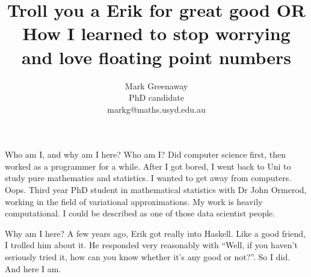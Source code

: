 \documentclass{beamer}
\title{Troll you a Erik for great good OR How I learned to stop worrying and love floating point numbers}
\author{Mark Greenaway \\ PhD candidate \\ markg@maths.usyd.edu.au}
\begin{document}
\begin{frame}
\maketitle
\end{frame}





\begin{frame}{Who am I, and why am I here?}
Who am I?
Did computer science first, then worked as a programmer for a while.
After I got bored, I went back to Uni to study pure mathematics and statistics. I wanted to get away from
computers. Oops.
Third year PhD student in mathematical statistics with Dr John Ormerod, working in the field of variational
approximations. My work is heavily computational.
I could be described as one of those data scientist people.

Why am I here?
A few years ago, Erik got really into Haskell.
Like a good friend, I trolled him about it.
He responded very reasonably with ``Well, if you haven't seriously tried it, how can you know whether it's
any good or not?''.
So I did. And here I am.
\end{frame}
\end{document}
